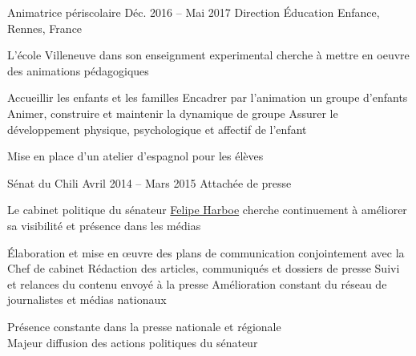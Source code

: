 \begin{joblist}



\item[Animatrice périscolaire]{Déc. 2016 -- Mai 2017 }     
  	{Direction Éducation Enfance, Rennes, France}     
	{
		 L'école Villeneuve dans son enseignment experimental cherche à mettre en oeuvre des animations pédagogiques \\
		  
		\iftbftiny \setlength{\parskip}{-10pt} \fi
		\begin{itemize}
			  \iftbftiny \setlength\itemsep{-3pt} \fi
			  \cvitem[\checkmark] Accueillir les enfants et les familles
			  \cvitem[\checkmark] Encadrer par l’animation un groupe d’enfants
			  \cvitem[\checkmark] Animer, construire et maintenir la dynamique de groupe
			  \cvitem[\checkmark] Assurer le développement physique, psychologique et affectif de l’enfant
		\end{itemize}

		 Mise en place d'un atelier d'espagnol pour les élèves
	}



\item[Sénat du Chili]{Avril 2014 -- Mars 2015}
     {Attachée de presse}
	 {
			 Le cabinet politique du sénateur \href{http://harboesenador.cl/}{Felipe Harboe} cherche continuement à améliorer sa visibilité et présence dans les médias \\ 
			\mission{Missions :} 
                
			\iftbftiny \setlength{\parskip}{-10pt} \fi
			\begin{itemize}
			  \iftbftiny \setlength\itemsep{-3pt} \fi
			  \cvitem[\checkmark] Élaboration et mise en œuvre des plans de communication conjointement avec la Chef de cabinet
			  \cvitem[\checkmark] Rédaction des articles, communiqués et dossiers de presse
			  \cvitem[\checkmark] Suivi et relances du contenu envoyé à la presse
			  \cvitem[\checkmark] Amélioration constant du réseau de journalistes et médias nationaux
			\end{itemize}     
			
		 Présence constante dans la presse nationale et régionale  \\
		\mission{}            Majeur diffusion des actions politiques du sénateur
	}
    
    
    

\end{joblist}
